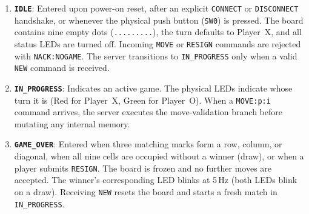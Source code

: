\begin{enumerate}
    \item \textbf{\texttt{IDLE}}: Entered upon power-on reset, after an explicit \texttt{CONNECT} or \texttt{DISCONNECT} handshake, or whenever the physical push button (\texttt{SW0}) is pressed. The board contains nine empty dots (\texttt{.........}), the turn defaults to Player~X, and all status LEDs are turned off. Incoming \texttt{MOVE} or \texttt{RESIGN} commands are rejected with \texttt{NACK:NOGAME}. The server transitions to \texttt{IN\_PROGRESS} only when a valid \texttt{NEW} command is received.
    \item \textbf{\texttt{IN\_PROGRESS}}: Indicates an active game. The physical LEDs indicate whose turn it is (Red for Player~X, Green for Player~O). When a \texttt{MOVE:p:i} command arrives, the server executes the move-validation branch before mutating any internal memory.
    \item \textbf{\texttt{GAME\_OVER}}: Entered when three matching marks form a row, column, or diagonal, when all nine cells are occupied without a winner (draw), or when a player submits \texttt{RESIGN}. The board is frozen and no further moves are accepted. The winner's corresponding LED blinks at 5\,Hz (both LEDs blink on a draw). Receiving \texttt{NEW} resets the board and starts a fresh match in \texttt{IN\_PROGRESS}.
\end{enumerate}

